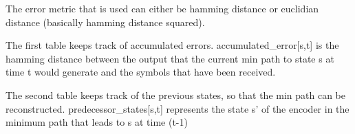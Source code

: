 \documentclass{article}
\begin{document}
The error metric that is used can either be hamming distance or euclidian distance (basically
hamming distance squared).

The first table keeps track of accumulated errors. accumulated\_error[s,t] is the hamming distance
between the output that the current min path to state s at time t would generate and the
symbols that have been received. 

The second table keeps track of the previous states, so that the min path
can be reconstructed. predecessor\_states[s,t] represents the state s' of the encoder
in the minimum path that leads to s at time (t-1) 



\begin{small}


\end{small}
\end{document}
